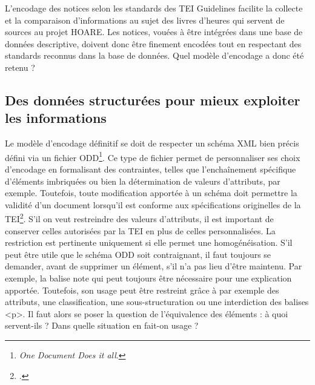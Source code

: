 \documentclass[a4paper,12pt,twoside]{book}
\begin{document}
L'encodage des notices selon les standards des TEI Guidelines facilite la collecte et la comparaison d'informations au sujet des livres d'heures qui servent de sources au projet HOARE. Les notices, vouées à être intégrées dans une base de données descriptive, doivent donc être finement encodées tout en respectant des standards reconnus dans la base de données. Quel modèle d'encodage a donc été retenu ?
	
	\subsection{\label{donnees_structurees_infos}Des données structurées pour mieux exploiter les informations}
	
	Le modèle d'encodage définitif se doit de respecter un schéma XML bien précis défini via un fichier ODD\footnote{\textit{One Document Does it all}.}. Ce type de fichier permet de personnaliser ses choix d'encodage en formalisant des contraintes, telles que l'enchaînement spécifique d'éléments imbriquées ou bien la détermination de valeurs d'attributs, par exemple. Toutefois, toute modification apportée à un schéma doit permettre la validité d'un document lorsqu'il est conforme aux spécifications originelles de la TEI\footcite{TEI_ODD_Camps}. S'il on veut restreindre des valeurs d'attributs, il est important de conserver celles autorisées par la TEI en plus de celles personnalisées. La restriction est pertinente uniquement si elle permet une homogénéisation. S'il peut être utile que le schéma ODD soit contraignant, il faut toujours se demander, avant de supprimer un élément, s’il n’a pas lieu d’être maintenu. Par exemple, la balise note qui peut toujours être nécessaire pour une explication apportée. Toutefois, son usage peut être restreint grâce à par exemple des attributs, une classification, une sous-structuration ou une interdiction des balises \textless p\textgreater . Il faut alors se poser la question de l’équivalence des éléments : à quoi servent-ils ? Dans quelle situation en fait-on usage ?\\
	
\end{document}
